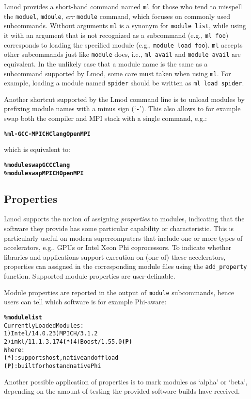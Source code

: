 Lmod provides a short-hand command named \texttt{\small ml} for those who tend to
misspell the \texttt{\small moduel}, \texttt{\small mdoule}, \emph{err}
\texttt{\small module} command, which focuses on
commonly used subcommands. Without arguments \texttt{\small ml} is a synonym for
\texttt{\small module list}, while using it with an argument that is not
recognized as a subcommand (e.g., \texttt{\small ml foo}) corresponds to loading
the specified module (e.g., \texttt{\small module load foo}).
\texttt{\small ml} accepts other subcommands just like \texttt{\small module} does,
i.e., \texttt{\small ml avail} and \texttt{\small module avail} are equivalent.
In the unlikely case that a module name is the same as a subcommand supported by Lmod, 
some care must taken when using \texttt{\small ml}. For example, loading a module
named \texttt{\small spider} should be written as \texttt{\small ml load spider}.

Another shortcut supported by the Lmod command line is to unload modules by
prefixing module names with a minus sign (`\texttt{\small-}'). This also allows to
for example swap both the compiler and MPI stack with a single command, e.g.:
{\small
  \begin{alltt}
      \textbf{\% ml -GCC -MPICH Clang OpenMPI}\
  \end{alltt}
}
\noindent
which is equivalent to:{\small
  \begin{alltt}
      \textbf{\% module swap GCC Clang}
      \textbf{\% module swap MPICH OpenMPI}\
  \end{alltt}
}

\subsection{Properties}

Lmod supports the notion of assigning \emph{properties} to modules,
indicating that the software they provide has some particular capability or
characteristic. This is particularly useful on modern supercomputers that include
one or more types of accelerators, e.g., GPUs or Intel Xeon Phi coprocessors.
To indicate whether libraries and applications support execution on (one of) these
accelerators, properties can assigned in the corresponding module files
using the \texttt{\small add\_property} function. Supported module
properties are user-definable.

Module properties are reported in the output of \texttt{\small module} subcommands,
hence users can tell which software is for example Phi-aware:
{\small
\begin{alltt}
  \textbf{\% module list}
  Currently Loaded Modules:
    1) Intel/14.0.2        3) MPICH/3.1.2
    2) imkl/11.1.3.174 \textbf{(*)} 4) Boost/1.55.0 \textbf{(P)}
  Where:
   \textbf{(*)}:  supports host, native and offload
   \textbf{(P)}:  built for host and native Phi
\end{alltt}
}
\noindent Another possible application of properties is to mark modules as `alpha'
or `beta', depending on the amount of testing the provided software builds have
received.

